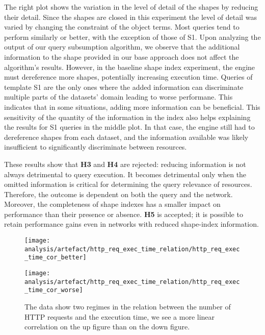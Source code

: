 The right plot shows the variation in the level of detail of the shapes by reducing their detail.
Since the shapes are closed in this experiment the level of detail was varied by changing the constraint of the object terms.
Most queries tend to perform similarly or better, with the exception of those of S1.
Upon analyzing the output of our query subsumption algorithm, we observe that the additional information to the shape provided in our base approach does not affect the algorithm's results.
However, in the baseline shape index experiment, the engine must dereference more shapes, potentially increasing execution time.
Queries of template S1 are the only ones where the added information can discriminate multiple parts of the datasets' domain leading to worse performane.
This indicates that in some situations, adding more information can be beneficial.
This sensitivity of the quantity of the information in the index also helps explaining the results for S1 queries in the middle plot. 
In that case, the engine still had to dereference shapes from each dataset, and the information available was likely insufficient to significantly discriminate between resources.

These results show that \textbf{H3} and \textbf{H4} are rejected: reducing information is not always detrimental to query execution.
It becomes detrimental only when the omitted information is critical for determining the query relevance of resources. 
Therefore, the outcome is dependent on both the query and the network. 
Moreover, the completeness of shape indexes has a smaller impact on performance than their presence or absence.
\textbf{H5} is accepted; it is possible to retain performance gains even in networks with reduced shape-index information.

\begin{figure}[htbp]
    \centering
    \begin{minipage}[t]{1.0\linewidth}
        \centering
        \texttt{[image: analysis/artefact/http\_req\_exec\_time\_relation/http\_req\_exec\_time\_cor\_better]}
        \label{fig:http_req_exec_time_cor_better}
    \end{minipage}
    \hspace{0.05\textwidth}
    \begin{minipage}[t]{1.0\linewidth}
        \centering
        \texttt{[image: analysis/artefact/http\_req\_exec\_time\_relation/http\_req\_exec\_time\_cor\_worse]}
        \label{fig:http_req_exec_time_cor_worse}
    \end{minipage}

    \caption{
        The data show two regimes in the relation between the number of HTTP requests and the execution time, 
        we see a more linear correlation on the up figure than on the down figure.
        }
    \label{fig:http_req_exec_time_cor}
\end{figure}

